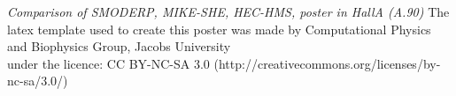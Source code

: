 \documentclass{beamer}
\begin{document}
% 

\begin{frame}[t]

\begin{columns}[t] 

  \begin{column}{\sepwid}\end{column}
  
  
  \begin{column}{\oneprvni} 
    
  \end{column}


  \separacnisloupec


  \begin{column}{\twodruhy} 
    
  \end{column}

  \separacnisloupec

  \begin{column}{\threetreti} 
    
  \end{column}
  
  \begin{column}{\sepwid}\end{column}
  
  \end{columns}
  \textit{Comparison of SMODERP, MIKE-SHE, HEC-HMS, poster in HallA (A.90)}
  \hfill {\tiny The latex template used to create this poster was made by Computational Physics and Biophysics Group, Jacobs University\\[-18pt] \hfill under the licence: CC BY-NC-SA 3.0 (http://creativecommons.org/licenses/by-nc-sa/3.0/)}
  \end{frame} %
\end{document}
